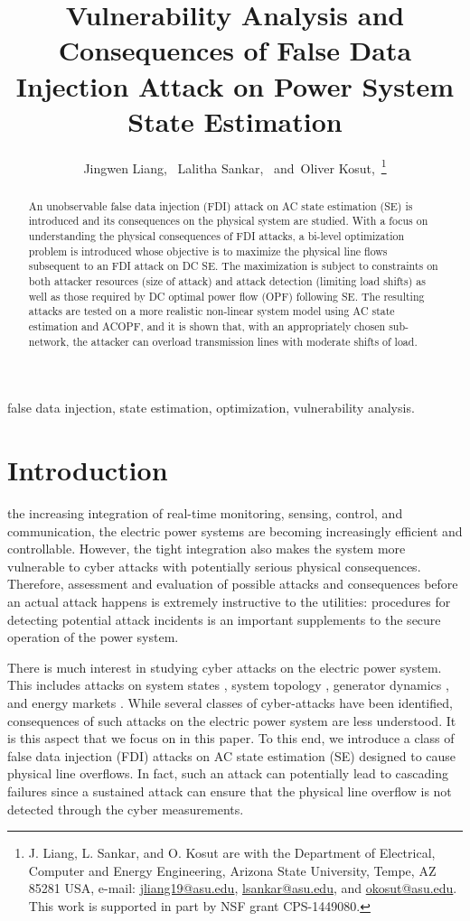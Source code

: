 \documentclass[twocolumn,english,final,journal]{IEEEtran}
\title{Vulnerability Analysis and Consequences of False Data Injection Attack
on Power System State Estimation}
\author{Jingwen Liang,~\IEEEmembership{Student Member,~IEEE,} Lalitha Sankar,~\IEEEmembership{Member, IEEE,}
and~Oliver Kosut,~\IEEEmembership{Member, IEEE}\thanks{J. Liang, L. Sankar, and O. Kosut are with the Department of Electrical,
Computer and Energy Engineering, Arizona State University, Tempe,
AZ 85281 USA, e-mail: \protect\href{mailto:jliang19@asu.edu}{jliang19@asu.edu},
\protect\href{mailto:lsankar@asu.edu}{lsankar@asu.edu}, and \protect\href{mailto:okosut@asu.edu}{okosut@asu.edu}.
 This work is supported in part by NSF grant CPS-1449080.}}
\theoremstyle{plain}
\theoremstyle{definition}
\begin{document}
\maketitle
\IEEEpeerreviewmaketitle
\begin{abstract}
An unobservable false data injection (FDI) attack on AC state estimation
(SE) is introduced and its consequences on the physical system are
studied. With a focus on understanding the physical consequences of
FDI attacks, a bi-level optimization problem is introduced whose objective
is to maximize the physical line flows subsequent to an FDI attack
on DC SE. The maximization is subject to constraints on both attacker
resources (size of attack) and attack detection (limiting load shifts)
as well as those required by DC optimal power flow (OPF) following
SE. The resulting attacks are tested on a more realistic non-linear
system model using AC state estimation and ACOPF, and it is shown
that, with an appropriately chosen sub-network, the attacker can overload
transmission lines with moderate shifts of load. \end{abstract}
\begin{IEEEkeywords}
false data injection, state estimation, optimization, vulnerability analysis.
\end{IEEEkeywords}
\section{Introduction}

 the increasing integration of real-time
monitoring, sensing, control, and communication, the electric power systems are becoming increasingly efficient and controllable.
However, the tight integration also makes the system more vulnerable
to cyber attacks with potentially serious physical consequences. Therefore,
assessment and evaluation of possible attacks and consequences before
an actual attack happens is extremely instructive to the utilities:
procedures for detecting potential attack incidents is an
important supplements to the secure operation of the power system.

There is much interest in studying cyber attacks on the electric power
system. This includes attacks on system states ,
system topology , generator
dynamics , and energy markets
. While several
classes of cyber-attacks have been identified, consequences of such
attacks on the electric power system are less understood. It is this
aspect that we focus on in this paper. To this end, we introduce a
class of false data injection (FDI) attacks on AC state estimation
(SE) designed to cause physical line overflows. In fact, such an attack
can potentially lead to cascading failures since a sustained attack
can ensure that the physical line overflow is not detected through
the cyber measurements.
\end{document}
